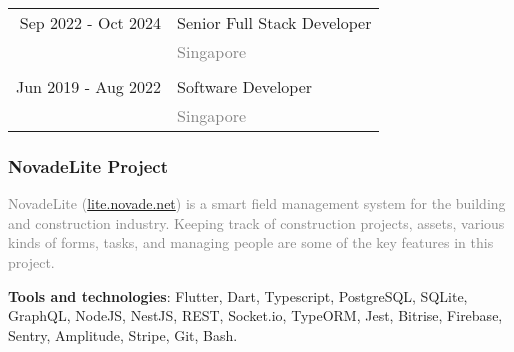 \documentclass[a4paper,11pt]{article}
\begin{document}
\begin{tabular}{r|l}
  \footnotesize{Sep 2022 - Oct 2024} & Senior Full Stack Developer                \\
                                     & \textcolor{gray}{\footnotesize{Singapore}} \\
  \\
  \footnotesize{Jun 2019 - Aug 2022} & Software Developer                         \\
                                     & \textcolor{gray}{\footnotesize{Singapore}} \\
\end{tabular}


\subsubsection*{NovadeLite Project}

\textcolor{gray}{\small{NovadeLite (\textcolor{blue}{\href{https://lite.novade.net}{lite.novade.net}}) is a smart field management system for the building and construction
    industry. Keeping track of construction projects, assets, various kinds of forms, tasks, and managing people are some
    of the key features in this project.}}

\hspace{1pt}

\small \textbf{Tools and technologies}: {\footnotesize Flutter, Dart, Typescript, PostgreSQL, SQLite, GraphQL, NodeJS, NestJS, REST, Socket.io, TypeORM, Jest, Bitrise, Firebase, Sentry, Amplitude, Stripe, Git, Bash}.
\end{document}
